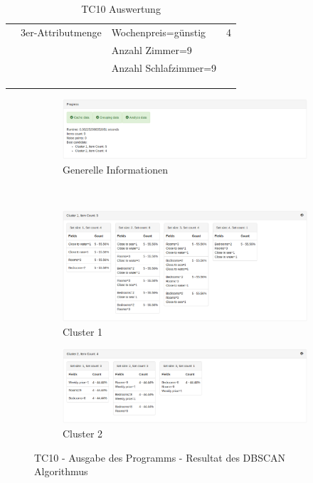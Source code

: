 \begin{longtable}{ | l | l | l | l |}
	& 3er-Attributmenge & \tabitem Wochenpreis=günstig & 4 \\
	& & \tabitem Anzahl Zimmer=9 & \\ 
	& & \tabitem Anzahl Schlafzimmer=9 & \\ \hline
	
	\rowcolor{tableheadcolor}
	\multicolumn{4}{|l|}{\bfseries Testergebnis} \\ \hline 
	\multicolumn{4}{|l|}{\cellcolor{green!25}} \\ \hline 
	
	\caption{TC10 Auswertung}
	\centering
	\label{fig:testingfazit:testing:testcases:10}
\end{longtable}
\begin{figure}[H]
	\begin{subfigure}[t]{1\textwidth}
		\centering
		\includegraphics[width=1\textwidth]{images/tc10-dbscan-1}
		\caption{Generelle Informationen}
		\label{fig:testingfazit:testing:testcases:10-1-1}
	\end{subfigure} \\
	\begin{subfigure}[t]{1\textwidth}
		\centering
		\includegraphics[width=1\textwidth]{images/tc10-dbscan-2}
		\caption{Cluster 1}
		\label{fig:testingfazit:testing:testcases:10-1-2}
	\end{subfigure}
	\begin{subfigure}[t]{1\textwidth}
		\centering
		\includegraphics[width=1\textwidth]{images/tc10-dbscan-3}
		\caption{Cluster 2}
		\label{fig:testingfazit:testing:testcases:10-1-3}
	\end{subfigure}
	\caption{TC10 - Ausgabe des Programms - Resultat des DBSCAN Algorithmus}
	\label{fig:testingfazit:testing:testcases:10-1}
\end{figure}
